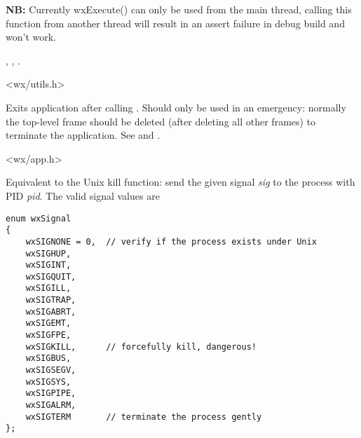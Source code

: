 {\bf NB:} Currently wxExecute() can only be used from the main thread, calling
this function from another thread will result in an assert failure in debug
build and won't work.


, , .







<wx/utils.h>


\label{wxexit}


Exits application after calling .
Should only be used in an emergency: normally the top-level frame
should be deleted (after deleting all other frames) to terminate the
application. See  and .


<wx/app.h>


\label{wxkill}


Equivalent to the Unix kill function: send the given signal {\it sig} to the
process with PID {\it pid}. The valid signal values are

\begin{verbatim}
enum wxSignal
{
    wxSIGNONE = 0,  // verify if the process exists under Unix
    wxSIGHUP,
    wxSIGINT,
    wxSIGQUIT,
    wxSIGILL,
    wxSIGTRAP,
    wxSIGABRT,
    wxSIGEMT,
    wxSIGFPE,
    wxSIGKILL,      // forcefully kill, dangerous!
    wxSIGBUS,
    wxSIGSEGV,
    wxSIGSYS,
    wxSIGPIPE,
    wxSIGALRM,
    wxSIGTERM       // terminate the process gently
};
\end{verbatim}

